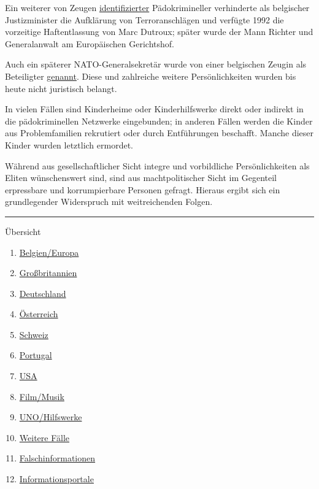 Ein weiterer von Zeugen
\href{https://www.pdf-archive.com/2020/07/18/dutroux-x-dossiers-accused-overview-2007-isgp/dutroux-x-dossiers-accused-overview-2007-isgp.pdf\#page=175}{identifizierter}
Pädokrimineller verhinderte als belgischer Justizminister die Aufklärung
von Terroranschlägen und verfügte 1992 die vorzeitige Haftentlassung von
Marc Dutroux; später wurde der Mann Richter und Generalanwalt am
Europäischen Gerichtshof.

Auch ein späterer NATO-Generalsekretär wurde von einer belgischen Zeugin
als Beteiligter
\href{https://www.pdf-archive.com/2020/07/18/dutroux-x-dossiers-accused-overview-2007-isgp/dutroux-x-dossiers-accused-overview-2007-isgp.pdf\#page=53}{genannt}.
Diese und zahlreiche weitere Persönlichkeiten wurden bis heute nicht
juristisch belangt.

In vielen Fällen sind Kinderheime oder Kinderhilfswerke direkt oder
indirekt in die pädokriminellen Netzwerke eingebunden; in anderen Fällen
werden die Kinder aus Problemfamilien rekrutiert oder durch Entführungen
beschafft. Manche dieser Kinder wurden letztlich ermordet.

Während aus gesellschaftlicher Sicht integre und vorbildliche
Persönlichkeiten als Eliten­ wün­schens­wert sind, sind aus
machtpolitischer Sicht im Gegenteil erpressbare und korrumpierbare
Personen gefragt. Hieraus ergibt sich ein grundlegender Widerspruch mit
weitreichenden Folgen.

\begin{center}\rule{0.5\linewidth}{\linethickness}\end{center}

Übersicht

\begin{enumerate}
\def\labelenumi{\arabic{enumi}.}
\tightlist
\item
  \protect\hyperlink{belgien-europa}{Belgien/Europa}
\item
  \protect\hyperlink{grossbritannien}{Großbritannien}
\item
  \protect\hyperlink{deutschland}{Deutschland}
\item
  \protect\hyperlink{oesterreich}{Österreich}
\item
  \protect\hyperlink{schweiz}{Schweiz}
\item
  \protect\hyperlink{portugal}{Portugal}
\item
  \protect\hyperlink{usa}{USA}
\item
  \protect\hyperlink{hollywood}{Film/Musik}
\item
  \protect\hyperlink{uno}{UNO/Hilfswerke}
\item
  \protect\hyperlink{weitere}{Weitere Fälle}
\item
  \protect\hyperlink{fakes}{Falschinformationen}
\item
  \protect\hyperlink{informationsportale}{Informationsportale}
\end{enumerate}

